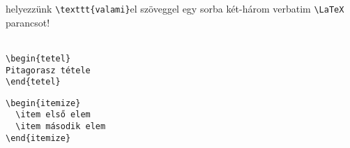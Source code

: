 \documentclass{article}
\begin{document}

helyezzünk \verb|\texttt{valami}|el szöveggel egy sorba két-három verbatim \verb|\LaTeX| parancsot!
\\
\\
\hulipsum[1]

\begin{forraskod}
\caption{tetel}
\label{verb:tetel}

\begin{verbatim}
\begin{tetel}
Pitagorasz tétele
\end{tetel}
\end{verbatim}
\end{forraskod}

\hulipsum[2]

\begin{forraskod}
\caption{lista}
\label{verb:lista}

\begin{verbatim}
\begin{itemize}
  \item első elem
  \item második elem
\end{itemize}
\end{verbatim}
\end{forraskod}

\hulipsum[3]
\end{document}
